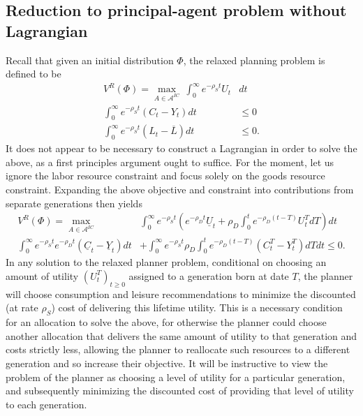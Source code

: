 \documentclass[11pt]{article}
\theoremstyle{plain}
\begin{document}
\iffalse
\subsection{Reduction to principal-agent problem without Lagrangian}

Recall that given an initial distribution $\Phi$, the relaxed planning problem is defined to be 
\begin{align*}
V^R(\Phi) = \max_{A \in \mathcal{A}^{IC}} \ \int_0^{\infty} e^{-\rho_S t} U_t & dt
\\ \int_0^{\infty}e^{-\rho_S t}(C_t - Y_t)dt & \leq 0
\\ \int_0^{\infty}e^{-\rho_S t}(L_t - \overline{L})dt & \leq 0.
\end{align*}
It does not appear to be necessary to construct a Lagrangian in order to solve the above, as a first principles argument ought to suffice. For the moment, let us ignore the labor resource constraint and focus solely on the goods resource constraint. Expanding the above objective and constraint into contributions from separate generations then yields 
\begin{align*}
V^R(\Phi) = \max_{A \in \mathcal{A}^{IC}} \ & \int_0^{\infty} e^{-\rho_S t} {\left(e^{- \rho_D t}\underline{U}_t + \rho_D\int_0^te^{-\rho_D(t-T)} U^T_tdT \right)} dt
\\ \int_0^{\infty}e^{-\rho_S t}e^{-\rho_Dt}(\underline{C}_t - \underline{Y}_t)dt
& + \int_0^{\infty}e^{-\rho_S t}\rho_D\int_0^te^{-\rho_D (t-T)} (C^T_t - Y^T_t)dTdt \leq 0.
\end{align*}
In any solution to the relaxed planner problem, conditional on choosing an amount of utility $(U^T_t)_{t\geq0}$ assigned to a generation born at date $T$, the planner will choose consumption and leisure recommendations to minimize the discounted (at rate $\rho_S$) cost of delivering this lifetime utility. This is a necessary condition for an allocation to solve the above, for otherwise the planner could choose another allocation that delivers the same amount of utility to that generation and costs strictly less, allowing the planner to reallocate such resources to a different generation and so increase their objective. It will be instructive to view the problem of the planner as choosing a level of utility for a particular generation, and subsequently minimizing the discounted cost of providing that level of utility to each generation.
\end{document}
